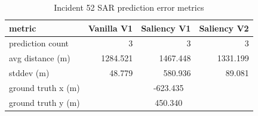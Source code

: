 \begin{table}[ht]
\centering
\caption{Incident 52 SAR prediction error metrics}
\label{tab:sar-incident-52}
\begin{tabular}{lrrr}
\hline
metric & Vanilla V1 & Saliency V1 & Saliency V2 \\
\hline
prediction count & 3 & 3 & 3 \\
avg distance (m) & 1284.521 & 1467.448 & 1331.199 \\
stddev (m) & 48.779 & 580.936 & 89.081 \\
ground truth x (m) & \multicolumn{3}{c}{-623.435} \\
ground truth y (m) & \multicolumn{3}{c}{450.340} \\
\hline
\end{tabular}
\end{table}
